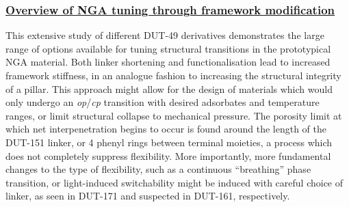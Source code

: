 \pagebreak
\subsubsection{\underline{Overview of NGA tuning through framework modification}}

This extensive study of different DUT-49 derivatives demonstrates the 
large range of options available for tuning structural 
transitions in the prototypical \gls{NGA} material. Both linker 
shortening and functionalisation lead to increased framework
stiffness, in an analogue fashion to increasing the 
structural integrity of a pillar. This approach might allow 
for the design of materials which would only undergo an 
\textit{op}/\textit{cp} transition with desired adsorbates and
temperature ranges, or limit structural collapse to mechanical 
pressure. The porosity limit at which net interpenetration begins
to occur is found around the length of the DUT-151 linker, 
or 4 phenyl rings between terminal moieties, a process which does 
not completely suppress flexibility. More importantly, more 
fundamental changes to the type of flexibility, such as 
a continuous ``breathing'' phase transition, or light-induced
switchability might be induced with careful choice of linker,
as seen in DUT-171 and suspected in DUT-161, respectively.